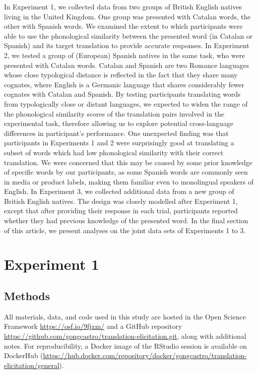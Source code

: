 \documentclass[
  man,
  longtable,
  nolmodern,
  notxfonts,
  notimes,
  colorlinks=true,linkcolor=blue,citecolor=blue,urlcolor=blue]{apa7}
\begin{document}
In Experiment 1, we collected data from two groups of British English
natives living in the United Kingdom. One group was presented with
Catalan words, the other with Spanish words. We examined the extent to
which participants were able to use the phonological similarity between
the presented word (in Catalan or Spanish) and its target translation to
provide accurate responses. In Experiment 2, we tested a group of
(European) Spanish natives in the same task, who were presented with
Catalan words. Catalan and Spanish are two Romance languages whose close
typological distance is reflected in the fact that they share many
cognates, where English is a Germanic language that shares considerably
fewer cognates with Catalan and Spanish. By testing participants
translating words from typologically close or distant languages, we
expected to widen the range of the phonological similarity scores of the
translation pairs involved in the experimental task, therefore allowing
us to explore potential cross-language differences in participant's
performance. One unexpected finding was that participants in Experiments
1 and 2 were surprisingly good at translating a subset of words which
had low phonological similarity with their correct translation. We were
concerned that this may be caused by some prior knowledge of specific
words by our participants, as some Spanish words are commonly seen in
media or product labels, making them familiar even to monolingual
speakers of English. In Experiment 3, we collected additional data from
a new group of British English natives. The design was closely modelled
after Experiment 1, except that after providing their response in each
trial, participants reported whether they had previous knowledge of the
presented word. In the final section of this article, we present
analyses on the joint data sets of Experiments 1 to 3.

\section{Experiment 1}\label{experiment-1}

\subsection{Methods}\label{methods}

All materials, data, and code used in this study are hosted in the Open
Science Framework
\href{https://osf.io/9fjxm/?view_only=aab7636ce1af48cf832596a7ea9101c5/}{https://osf.io/9fjxm/}
and a GitHub repository
\url{https://github.com/gongcastro/translation-elicitation.git}, along
with additional notes. For reproducibility, a Docker image of the
RStudio session is available on DockerHub
(\url{https://hub.docker.com/repository/docker/gongcastro/translation-elicitation/general}).
\end{document}
